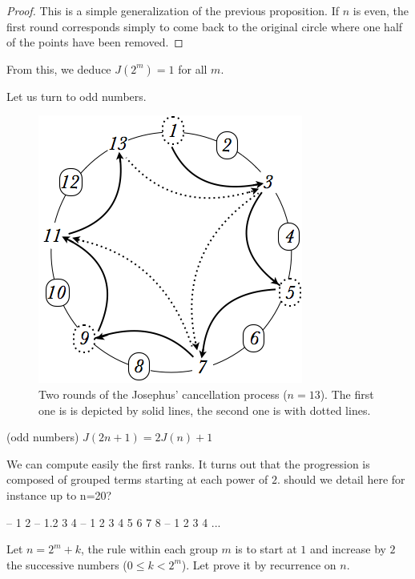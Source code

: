 {\begin{proof}
This is a simple generalization of the previous proposition.
If $n$ is even, the first round corresponds simply to come back to the original circle where one half of the points have been removed. 
\end{proof}

From this, we deduce $J(2^m)=1$ for all $m$.
\medskip

Let us turn to odd numbers.
\begin{figure}[h]
\begin{center}
        \includegraphics[scale=0.4]{FiguresMaths/josephus13}
        \caption{Two rounds of the Josephus' cancellation process ($n=13$).
        The first one is is depicted by solid lines, the second one is with dotted lines.}
        \label{fig:josephus13}
\end{center}
\end{figure}
\medskip

\begin{prop} (odd numbers)
$J(2n+1) = 2J(n)+1$ 
\end{prop}

We can compute easily the first ranks.
It turns out that the progression is composed of grouped terms starting at each power of $2$. 
{\Denis should we detail here for instance up to n=20?}

{ -- 1 2 -- 1.2 3 4 -- 1 2 3 4 5 6 7  8 -- 1  2  3 4 ...}

Let $n=2^m+k$, the rule within each group $m$ is to start at $1$ and increase by $2$ the successive numbers
($0 \leq k < 2^m$).
Let prove it by recurrence on $n$.
\medskip

}
